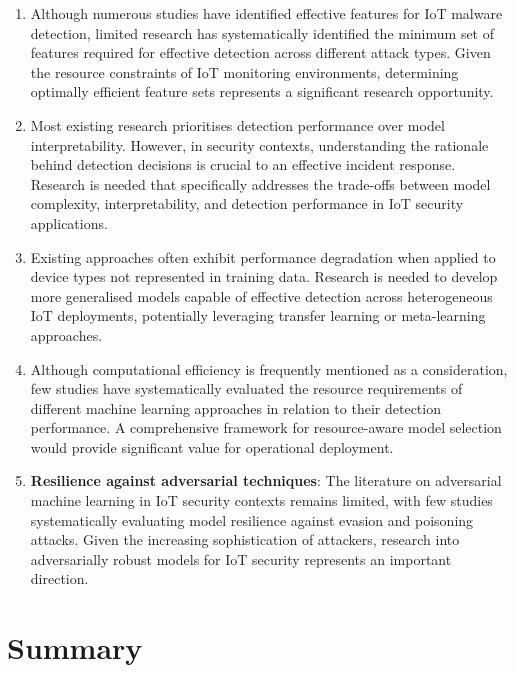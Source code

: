 \begin{enumerate}
    \item Although numerous studies have identified effective features for IoT malware detection, limited research has systematically identified the minimum set of features required for effective detection across different attack types. Given the resource constraints of IoT monitoring environments, determining optimally efficient feature sets represents a significant research opportunity.
    
    \item Most existing research prioritises detection performance over model interpretability. However, in security contexts, understanding the rationale behind detection decisions is crucial to an effective incident response. Research is needed that specifically addresses the trade-offs between model complexity, interpretability, and detection performance in IoT security applications.
    
    \item Existing approaches often exhibit performance degradation when applied to device types not represented in training data. Research is needed to develop more generalised models capable of effective detection across heterogeneous IoT deployments, potentially leveraging transfer learning or meta-learning approaches.
    
    \item Although computational efficiency is frequently mentioned as a consideration, few studies have systematically evaluated the resource requirements of different machine learning approaches in relation to their detection performance. A comprehensive framework for resource-aware model selection would provide significant value for operational deployment.
    
    \item \textbf{Resilience against adversarial techniques}: The literature on adversarial machine learning in IoT security contexts remains limited, with few studies systematically evaluating model resilience against evasion and poisoning attacks. Given the increasing sophistication of attackers, research into adversarially robust models for IoT security represents an important direction.
\end{enumerate}

\section{Summary}

